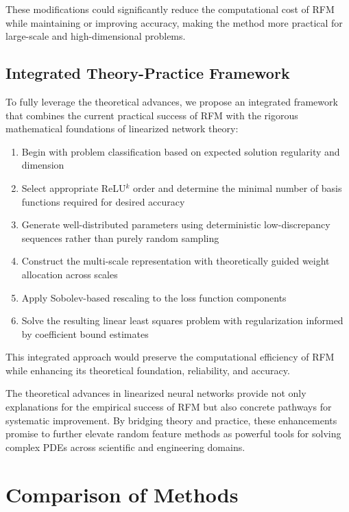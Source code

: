 \documentclass[11pt]{article}
\begin{document}
These modifications could significantly reduce the computational cost of RFM while maintaining or improving accuracy, making the method more practical for large-scale and high-dimensional problems.

\subsection{Integrated Theory-Practice Framework}

To fully leverage the theoretical advances, we propose an integrated framework that combines the current practical success of RFM with the rigorous mathematical foundations of linearized network theory:

\begin{enumerate}
    \item Begin with problem classification based on expected solution regularity and dimension
    
    \item Select appropriate ReLU$^k$ order and determine the minimal number of basis functions required for desired accuracy
    
    \item Generate well-distributed parameters using deterministic low-discrepancy sequences rather than purely random sampling
    
    \item Construct the multi-scale representation with theoretically guided weight allocation across scales
    
    \item Apply Sobolev-based rescaling to the loss function components
    
    \item Solve the resulting linear least squares problem with regularization informed by coefficient bound estimates
\end{enumerate}

This integrated approach would preserve the computational efficiency of RFM while enhancing its theoretical foundation, reliability, and accuracy.

The theoretical advances in linearized neural networks provide not only explanations for the empirical success of RFM but also concrete pathways for systematic improvement. By bridging theory and practice, these enhancements promise to further elevate random feature methods as powerful tools for solving complex PDEs across scientific and engineering domains.

\section{Comparison of Methods}
\end{document}
